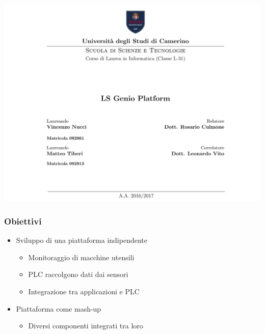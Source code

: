 \documentclass{beamer}
\date{}
\begin{document}
	
	\begin{frame}
	\centering
	\includegraphics[scale=0.25]{images/frontespizio-beamer.png}\par
\end{frame}

\begin{frame}
\frametitle{Obiettivi}
\begin{itemize}
	\item Sviluppo di una piattaforma indipendente
	\begin{itemize}
		\item Monitoraggio di macchine utensili
		\item PLC raccolgono dati dai sensori
		\item Integrazione tra applicazioni e PLC
	\end{itemize}
	\item Piattaforma come mash-up
	\begin{itemize}
		\item Diversi componenti integrati tra loro
	\end{itemize}
\end{itemize}
\end{frame}
\end{document}
